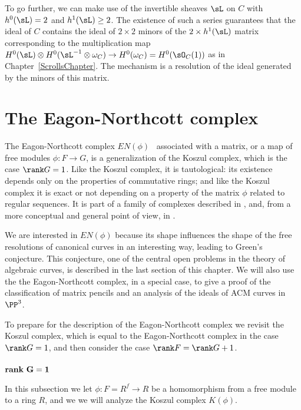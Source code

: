 To go further, we can make use of the invertible sheaves $\sL$ on $C$ with $h^0(\sL)=2$ and $h^1(\sL)\geq 2$. 
The existence of such a series guarantees that the ideal of $C$ contains the ideal of $2\times 2$ minors of the $2\times h^1(\sL)$
matrix
corresponding to the multiplication map 
$H^0(\sL) \otimes H^0(\sL^{-1}\otimes \omega_C) \to H^0(\omega_C) = H^0(\sO_C(1))$
as in Chapter~\ref{ScrollsChapter}.
The mechanism is a resolution of
the ideal generated by the minors of this matrix.
 
\section{The Eagon-Northcott complex}\label{EN section}

The Eagon-Northcott complex $EN(\phi)$~\cite{MR0142592} associated with a matrix, or a map of free modules $\phi: F\to G$,
is a generalization of the Koszul complex, which is the case $\rank G = 1$. Like the Koszul complex,
it is tautological: its existence depends only on the properties of commutative rings; and like the Koszul complex it is exact or not depending on a property of the matrix $\phi$ related to regular sequences. It is part of a family of complexes described in
\cite[Appendix A2]{Eisenbud1995}, and, from a more conceptual and general point of view, in \cite{Weyman-book}. 

We
are interested in $EN(\phi)$ because its shape
influences the shape of the free resolutions of canonical curves in an interesting way, 
leading to Green's conjecture. This conjecture, one of the central open problems in the theory of algebraic curves, is described in the last
section of this chapter. We will also use the the Eagon-Northcott complex, in a special case, to give a proof of the classification of matrix pencils and an analysis of the ideals of ACM curves in $\PP^{3}$.

To prepare for the description of the Eagon-Northcott complex we revisit the Koszul complex, which is equal
to the Eagon-Northcott complex in the case $\rank G = 1$, and then consider the case $\rank F = \rank G + 1$.

\subsubsection{$\mathbf {\bf rank\ }  \mathbf{G = 1}$}

In this subsection we let $\phi:F = R^{f}\to R$ be a homomorphism from a free module to a ring $R$, and we
we will analyze the Koszul complex $K(\phi)$. 

